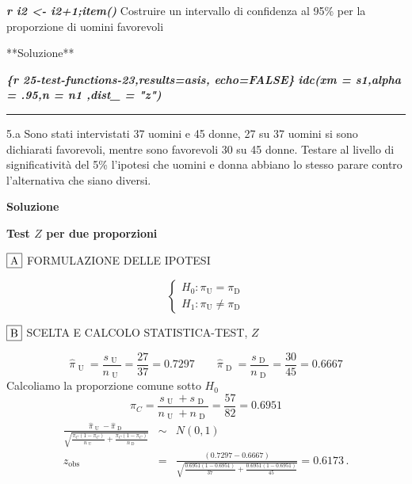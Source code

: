 \documentclass[
  11pt,
]{book}
\newenvironment{Shaded}{\begin{snugshade}}{\end{snugshade}}
\newcommand{\InformationTok}[1]{\textcolor[rgb]{0.56,0.35,0.01}{\textbf{\textit{#1}}}}
\newcommand{\NormalTok}[1]{#1}
\theoremstyle{mytheoremstyle}
\theoremstyle{mydefstyle}
\begin{document}
\begin{Shaded}
\begin{Highlighting}[]
\InformationTok{\textasciigrave{}r i2 \textless{}{-} i2+1;item()\textasciigrave{}}\NormalTok{ Costruire un intervallo di confidenza al 95\% per }
\NormalTok{la proporzione di uomini favorevoli}

\NormalTok{**Soluzione**}

\InformationTok{\textasciigrave{}\textasciigrave{}\textasciigrave{}\{r 25{-}test{-}functions{-}23,results=\textquotesingle{}asis\textquotesingle{}, echo=FALSE\} }
\InformationTok{idc(xm = s1,alpha = .95,n = n1 ,dist\_ = "z")}
\InformationTok{\textasciigrave{}\textasciigrave{}\textasciigrave{}}
\end{Highlighting}
\end{Shaded}

\begin{center}\rule{0.5\linewidth}{0.5pt}\end{center}

5.a Sono stati intervistati 37 uomini e 45 donne,
27 su 37 uomini si sono dichiarati favorevoli, mentre sono favorevoli
30 su 45 donne. Testare al livello di significatività del 5\% l'ipotesi
che uomini e donna abbiano lo stesso parare contro l'alternativa che siano
diversi.

\textbf{Soluzione}

\textbf{Test \(Z\) per due proporzioni}

\(\fbox{A}\) FORMULAZIONE DELLE IPOTESI

\[\begin{cases}
   H_0: \pi_\text{U} = \pi_\text{D} \\
   H_1: \pi_\text{U} \neq \pi_\text{D} 
   \end{cases}\]

\(\fbox{B}\) SCELTA E CALCOLO STATISTICA-TEST, \(Z\)

\[\hat\pi_\text{ U }=\frac{s_\text{ U }}{n_\text{ U }}=\frac{ 27 }{ 37 }= 0.7297 \qquad
   \hat\pi_\text{ D }=\frac{s_\text{ D }}{n_\text{ D }}=\frac{ 30 }{ 45 }= 0.6667 \]Calcoliamo la proporzione comune sotto \(H_0\)
\[
     \pi_C=\frac{s_\text{ U }+s_\text{ D }}{n_\text{ U }+n_\text{ D }}=
     \frac{ 57 }{ 82 }= 0.6951 
   \]\begin{eqnarray*}
   \frac{\hat\pi_\text{ U } - \hat\pi_\text{ D }}
   {\sqrt{\frac {\pi_C(1-\pi_C)}{n_\text{ U }}+\frac {\pi_C(1-\pi_C)}{n_\text{ D }}}}&\sim&N(0,1)\\
   z_{\text{obs}}
   &=& \frac{ ( 0.7297 -  0.6667 )} {\sqrt{\frac{ 0.6951 (1- 0.6951 )}{ 37 }+\frac{ 0.6951 (1- 0.6951 )}{ 45 }}}
   =   0.6173 \, .
   \end{eqnarray*}
\end{document}
